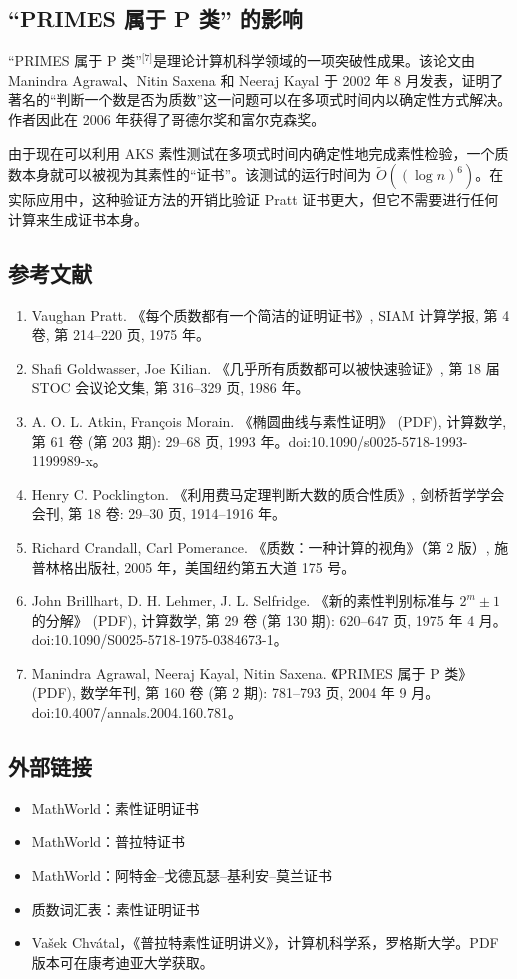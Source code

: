 \subsection{“PRIMES 属于 P 类” 的影响}
“PRIMES 属于 P 类”\(^\text{[7]}\)是理论计算机科学领域的一项突破性成果。该论文由 Manindra Agrawal、Nitin Saxena 和 Neeraj Kayal 于 2002 年 8 月发表，证明了著名的“判断一个数是否为质数”这一问题可以在多项式时间内以确定性方式解决。作者因此在 2006 年获得了哥德尔奖和富尔克森奖。

由于现在可以利用 AKS 素性测试在多项式时间内确定性地完成素性检验，一个质数本身就可以被视为其素性的“证书”。该测试的运行时间为 $\tilde{O}((\log n)^6)$。在实际应用中，这种验证方法的开销比验证 Pratt 证书更大，但它不需要进行任何计算来生成证书本身。
\subsection{参考文献}
\begin{enumerate}
\item Vaughan Pratt. 《每个质数都有一个简洁的证明证书》, SIAM 计算学报, 第 4 卷, 第 214–220 页, 1975 年。
\item Shafi Goldwasser, Joe Kilian. 《几乎所有质数都可以被快速验证》, 第 18 届 STOC 会议论文集, 第 316–329 页, 1986 年。
\item A. O. L. Atkin, François Morain. 《椭圆曲线与素性证明》 (PDF), 计算数学, 第 61 卷 (第 203 期): 29–68 页, 1993 年。doi:10.1090/s0025-5718-1993-1199989-x。
\item Henry C. Pocklington. 《利用费马定理判断大数的质合性质》, 剑桥哲学学会会刊, 第 18 卷: 29–30 页, 1914–1916 年。
\item Richard Crandall, Carl Pomerance. 《质数：一种计算的视角》（第 2 版）, 施普林格出版社, 2005 年，美国纽约第五大道 175 号。
\item John Brillhart, D. H. Lehmer, J. L. Selfridge. 《新的素性判别标准与 $2^m \pm 1$ 的分解》 (PDF), 计算数学, 第 29 卷 (第 130 期): 620–647 页, 1975 年 4 月。doi:10.1090/S0025-5718-1975-0384673-1。
\item Manindra Agrawal, Neeraj Kayal, Nitin Saxena. 《PRIMES 属于 P 类》 (PDF), 数学年刊, 第 160 卷 (第 2 期): 781–793 页, 2004 年 9 月。doi:10.4007/annals.2004.160.781。
\end{enumerate}
\subsection{外部链接}
\begin{itemize}
\item MathWorld：素性证明证书
\item MathWorld：普拉特证书
\item MathWorld：阿特金–戈德瓦瑟–基利安–莫兰证书
\item 质数词汇表：素性证明证书
\item Vašek Chvátal，《普拉特素性证明讲义》，计算机科学系，罗格斯大学。PDF 版本可在康考迪亚大学获取。
\end{itemize}